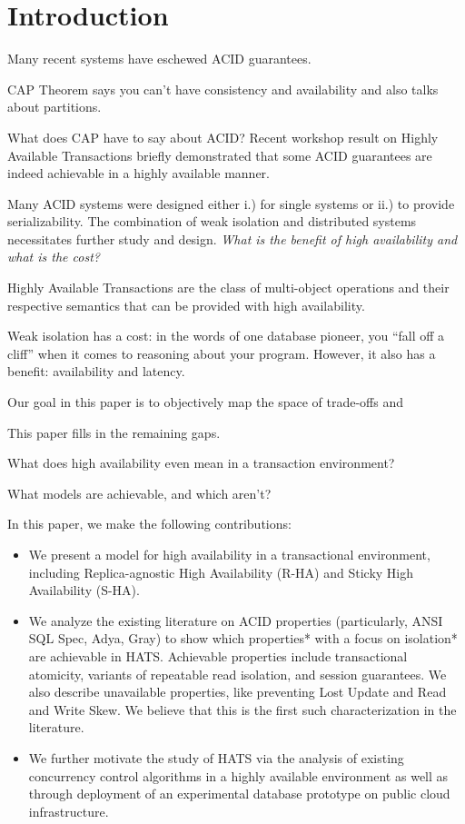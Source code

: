 

\section{Introduction}

Many recent systems have eschewed ACID guarantees.

CAP Theorem says you can't have consistency and availability and also talks about partitions.

What does CAP have to say about ACID? Recent workshop result on Highly Available Transactions briefly demonstrated that some ACID guarantees are indeed achievable in a highly available manner.

Many ACID systems were designed either i.) for single systems or ii.)
to provide serializability. The combination of weak isolation and
distributed systems necessitates further study and
design. \textit{What is the benefit of high availability and what is
  the cost?}

Highly Available Transactions are the class of multi-object operations
and their respective semantics that can be provided with high
availability.

Weak isolation has a cost: in the words of one database pioneer, you
``fall off a cliff'' when it comes to reasoning about your
program. However, it also has a benefit: availability and latency.

Our goal in this paper is to objectively map the space of trade-offs and 

 This paper fills in the remaining gaps.

What does high availability even mean in a transaction environment?

What models are achievable, and which aren't?

In this paper, we make the following contributions:

\begin{itemize}
\item We present a model for high availability in a transactional environment, including Replica-agnostic High Availability (R-HA) and Sticky High Availability (S-HA).
\item We analyze the existing literature on ACID properties (particularly, ANSI SQL Spec, Adya, Gray) to show which properties* with a focus on isolation* are achievable in HATS. Achievable properties include transactional atomicity, variants of repeatable read isolation, and session guarantees. We also describe unavailable properties, like preventing Lost Update and Read and Write Skew. We believe that this is the first such characterization in the literature.
\item We further motivate the study of HATS via the analysis of existing concurrency control algorithms in a highly available environment as well as through deployment of an experimental database prototype on public cloud infrastructure.
\end{itemize}

